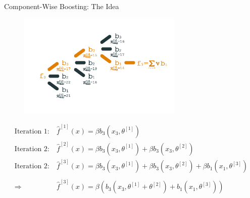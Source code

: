 \documentclass[10pt]{beamer}\usepackage[]{graphicx}\usepackage[]{color}
\begin{document}
\begin{frame}[fragile]{Component-Wise Boosting: The Idea}

\begin{figure}
\centering
\includegraphics[width=0.7\textwidth]{images/comp_boosting.png}
\end{figure}

\vspace{-1.5cm}

\begin{align*}
  \text{Iteration 1:} \ &\hat{f}^{[1]}(x) = \beta b_3(x_3, \theta^{[1]}) \\
  \text{Iteration 2:} \ &\hat{f}^{[2]}(x) = \beta b_3(x_3, \theta^{[1]}) + \beta b_3(x_3, \theta^{[2]}) \\
  \text{Iteration 2:} \ &\hat{f}^{[3]}(x) = \beta b_3(x_3, \theta^{[1]}) + \beta b_3(x_3, \theta^{[2]}) + \beta b_1(x_1, \theta^{[3]}) \\ \\
  \Rightarrow\ &\hat{f}^{[3]}(x) = \beta \left( b_3(x_3, \theta^{[1]} + \theta^{[2]}) + b_1(x_1, \theta^{[3]}) \right)
\end{align*}


\end{frame}
\end{document}
